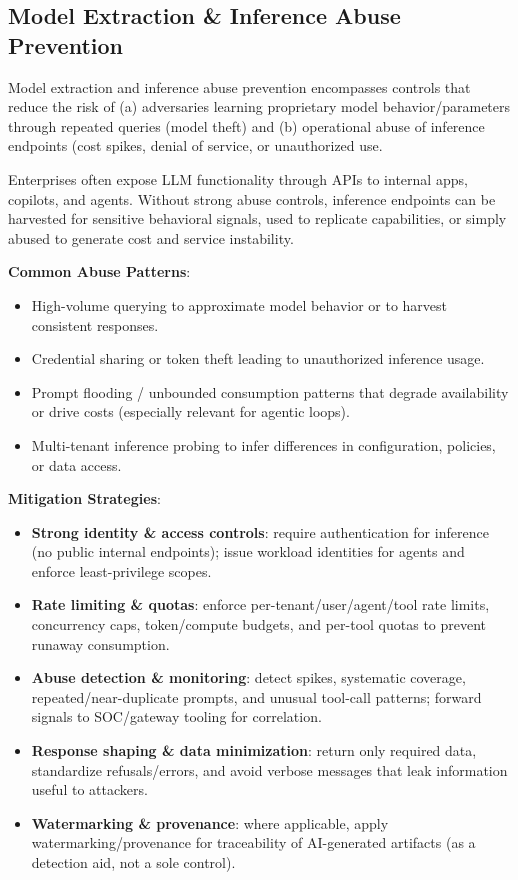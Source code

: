 \begin{TNtwocol}
    \section{Model Extraction & Inference Abuse Prevention}

    Model extraction and inference abuse prevention encompasses controls that reduce the risk of (a) adversaries learning proprietary model behavior/parameters through repeated queries (model theft) and (b) operational abuse of inference endpoints (cost spikes, denial of service, or unauthorized use.

    Enterprises often expose LLM functionality through APIs to internal apps, copilots, and agents. Without strong abuse controls, inference endpoints can be harvested for sensitive behavioral signals, used to replicate capabilities, or simply abused to generate cost and service instability.

    \textbf{Common Abuse Patterns}:
    \begin{itemize}
        \item High-volume querying to approximate model behavior or to harvest consistent responses.
        \item Credential sharing or token theft leading to unauthorized inference usage.
        \item Prompt flooding / unbounded consumption patterns that degrade availability or drive costs (especially relevant for agentic loops).
        \item Multi-tenant inference probing to infer differences in configuration, policies, or data access.
    \end{itemize}

    \textbf{Mitigation Strategies}:
    \begin{itemize}
        \item \textbf{Strong identity \& access controls}: require authentication for inference (no public internal endpoints); issue workload identities for agents and enforce least-privilege scopes.
        \item \textbf{Rate limiting \& quotas}: enforce per-tenant/user/agent/tool rate limits, concurrency caps, token/compute budgets, and per-tool quotas to prevent runaway consumption.
        \item \textbf{Abuse detection \& monitoring}: detect spikes, systematic coverage, repeated/near-duplicate prompts, and unusual tool-call patterns; forward signals to SOC/gateway tooling for correlation.
        \item \textbf{Response shaping \& data minimization}: return only required data, standardize refusals/errors, and avoid verbose messages that leak information useful to attackers.
        \item \textbf{Watermarking \& provenance}: where applicable, apply watermarking/provenance for traceability of AI-generated artifacts (as a detection aid, not a sole control).
    \end{itemize}


\end{TNtwocol}
